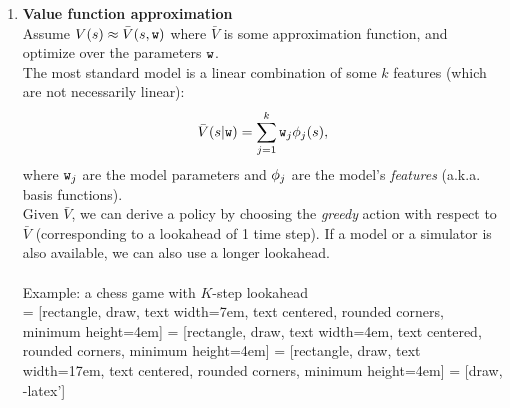 \begin{enumerate}
\item \textbf{Value function approximation}\\
Assume $V(s)\approx \bar{V}(s,\texttt{w})$ where $\bar{V}$ is some approximation function, and optimize over the parameters $\texttt{w}$.\\
The most standard model is a linear combination of some $k$ features (which are not necessarily linear):
$$\bar{V}(s|\texttt{w}) = \sum_{j=1}^k \texttt{w}_j \phi_j(s),$$
where $\texttt{w}_j$ are the model parameters and $\phi_j$ are the model's \emph{features} (a.k.a. basis functions).\\
Given $\bar{V}$, we can derive a policy by choosing the \emph{greedy} action with respect to $\bar{V}$ (corresponding to a lookahead of 1 time step). If a model or a simulator is also available, we can also use a longer lookahead.\\
\\
Example: a chess game with $K$-step lookahead\\
 = [rectangle, draw,
    text width=7em, text centered, rounded corners, minimum height=4em]
 = [rectangle, draw,
    text width=4em, text centered, rounded corners, minimum height=4em]
 = [rectangle, draw,
    text width=17em, text centered, rounded corners, minimum height=4em]
 = [draw, -latex']


\end{enumerate}
